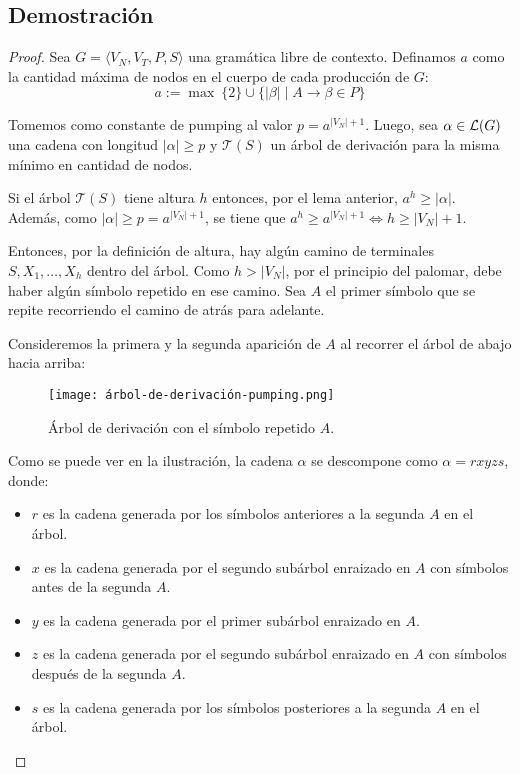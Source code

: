 \subsection{Demostración}

\begin{proof}
    Sea $G = \langle V_N, V_T, P, S \rangle$ una gramática libre de contexto. Definamos $a$ como la cantidad máxima de nodos en el cuerpo de cada producción de $G$:
    $$
        a := \max\ \{2\} \cup \{|\beta| \mid A \to \beta \in P\}
    $$

    Tomemos como constante de pumping al valor $p = a^{|V_N| + 1}$. Luego, sea $\alpha \in \mathcal{L}(G)$ una cadena con longitud $|\alpha| \geq p$ y $\mathcal T(S)$ un árbol de derivación para la misma mínimo en cantidad de nodos.
    
    Si el árbol $\mathcal T(S)$ tiene altura $h$ entonces, por el lema anterior, $a^h \geq |\alpha|$. Además, como $|\alpha| \geq p = a^{|V_N| + 1}$, se tiene que $a^h \geq a^{|V_N| + 1} \iff h \geq |V_N| + 1$.
    
    Entonces, por la definición de altura, hay algún camino de terminales $S, X_1, \dots, X_h$ dentro del árbol. Como $h > |V_N|$, por el principio del palomar, debe haber algún símbolo repetido en ese camino. Sea $A$ el primer símbolo que se repite recorriendo el camino de atrás para adelante.

    Consideremos la primera y la segunda aparición de $A$ al recorrer el árbol de abajo hacia arriba:
    \begin{figure}[H]
        \centering
        \texttt{[image: árbol-de-derivación-pumping.png]}
        \caption*{Árbol de derivación con el símbolo repetido $A$.}
    \end{figure}

    Como se puede ver en la ilustración, la cadena $\alpha$ se descompone como $\alpha = r x y z s$, donde:
    \begin{itemize}
        \item $r$ es la cadena generada por los símbolos anteriores a la segunda $A$ en el árbol.
        \item $x$ es la cadena generada por el segundo subárbol enraizado en $A$ con símbolos antes de la segunda $A$.
        \item $y$ es la cadena generada por el primer subárbol enraizado en $A$.
        \item $z$ es la cadena generada por el segundo subárbol enraizado en $A$ con símbolos después de la segunda $A$.
        \item $s$ es la cadena generada por los símbolos posteriores a la segunda $A$ en el árbol.
    \end{itemize}


\end{proof}

